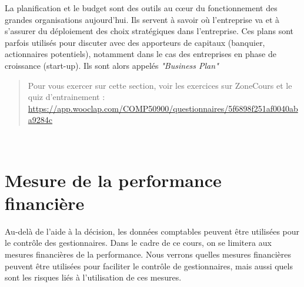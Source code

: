 \documentclass{tufte-handout}
\begin{document}
La planification et le budget sont des outils au cœur du fonctionnement des grandes organisations aujourd'hui. Ils servent à savoir où l'entreprise va et à s'assurer du déploiement des choix stratégiques dans l'entreprise. Ces plans sont parfois utilisés pour discuter avec des apporteurs de capitaux (banquier, actionnaires potentiels), notamment dans le cas des entreprises en phase de croissance (start-up). Ils sont alors appelés \emph{"Business Plan"}\\

\begin{quote}
Pour vous exercer sur cette section, voir les exercices sur ZoneCours et le quiz d'entrainement : \url{https://app.wooclap.com/COMP50900/questionnaires/5f6898f251af0040aba9284c}\\
\end{quote}

\clearpage\\
\section{Mesure de la performance financière}
\label{sec:orgdbe240b}
Au-delà de l'aide à la décision, les données comptables peuvent être utilisées pour le contrôle des gestionnaires. Dans le cadre de ce cours, on se limitera aux mesures financières de la performance. Nous verrons quelles mesures financières peuvent être utilisées pour faciliter le contrôle de gestionnaires, mais aussi quels sont les risques liés à l'utilisation de ces mesures.\\
\end{document}
